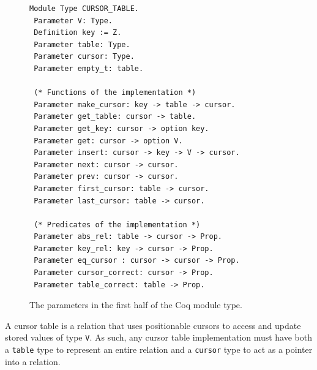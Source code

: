 \documentclass[12pt]{article}
\begin{document}
\begin{figure}[hbp]
\begin{singlespace}
\begin{verbatim}
Module Type CURSOR_TABLE.
 Parameter V: Type.
 Definition key := Z.
 Parameter table: Type.
 Parameter cursor: Type.
 Parameter empty_t: table.
 
 (* Functions of the implementation *)
 Parameter make_cursor: key -> table -> cursor.
 Parameter get_table: cursor -> table.
 Parameter get_key: cursor -> option key.
 Parameter get: cursor -> option V.
 Parameter insert: cursor -> key -> V -> cursor.
 Parameter next: cursor -> cursor.
 Parameter prev: cursor -> cursor.
 Parameter first_cursor: table -> cursor.
 Parameter last_cursor: table -> cursor.
 
 (* Predicates of the implementation *)
 Parameter abs_rel: table -> cursor -> Prop.
 Parameter key_rel: key -> cursor -> Prop.
 Parameter eq_cursor : cursor -> cursor -> Prop.
 Parameter cursor_correct: cursor -> Prop.
 Parameter table_correct: table -> Prop.
\end{verbatim}
\caption{The parameters in the first half of the Coq module type.}
\label{fig:params}
\end{singlespace}
\end{figure}

A cursor table is a relation that uses positionable cursors to access and update stored values of type \texttt{V}. As such, any cursor table implementation must have both a \texttt{table} type to represent an entire relation and a \texttt{cursor} type to act as a pointer into a relation.
\end{document}
